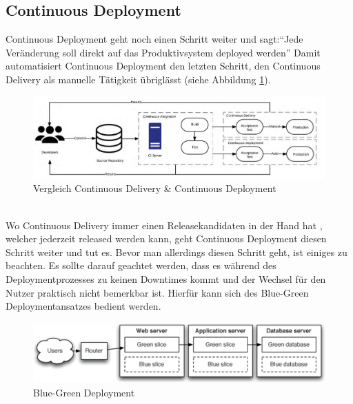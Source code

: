 \subsection{Continuous Deployment}
Continuous Deployment geht noch einen Schritt weiter und sagt:\enquote{Jede Veränderung soll direkt auf das Produktivsystem deployed werden}\autocite[Vgl.][S.17]{Stahl.2018} Damit automatisiert Continuous Deployment den letzten Schritt, den Continuous Delivery als manuelle Tätigkeit übriglässt (siehe Abbildung \ref{img:cde2}).
\begin{figure}[h!]
	\centering
	\includegraphics[scale = 0.6]{img/CDE2.png}
	\caption{Vergleich Continuous Delivery \& Continuous Deployment}
	\label{img:cde2}
\end{figure}\\
 Wo Continuous Delivery immer einen Releasekandidaten in der Hand hat , welcher jederzeit released werden kann, geht Continuous Deployment diesen Schritt weiter und tut es.\autocite[Vgl.][S.17]{Stahl.2018} Bevor man allerdings diesen Schritt geht, ist einiges zu beachten. Es sollte darauf geachtet werden, dass es während des Deploymentprozesses zu keinen Downtimes kommt und der Wechsel für den Nutzer praktisch nicht bemerkbar ist. Hierfür kann sich des Blue-Green Deploymentansatzes bedient werden.\autocite[Vgl.][S.407]{Farley.2010}
\begin{figure}[h!]
 	\centering
 	\includegraphics[scale = 1]{img/blue.jpg}
 	\caption{Blue-Green Deployment}
 	\label{img:blue}
\end{figure}
